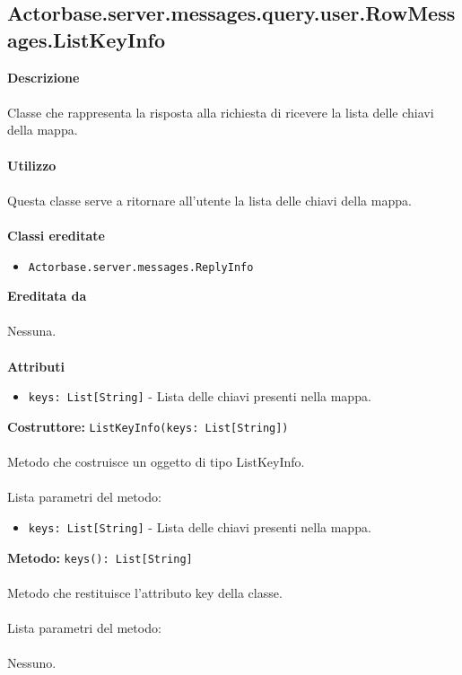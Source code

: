 \documentclass[a4paper]{article}
\begin{document}
	\subsection{Actorbase.server.messages.query.user.RowMessages.ListKeyInfo}
		\textbf{Descrizione}
			\\ \\
		Classe che rappresenta la risposta alla richiesta di ricevere la lista delle chiavi della mappa.
			\\ \\
		\textbf{Utilizzo}
			\\ \\
		Questa classe serve a ritornare all'utente la lista delle chiavi della mappa.
			\\ \\
		\textbf{Classi ereditate}
			\begin{itemize}
				\item \texttt{Actorbase.server.messages.ReplyInfo }
			\end{itemize}
		\textbf{Ereditata da}
			\\ \\
			Nessuna.
			\\ \\
		\textbf{Attributi}
			\begin{itemize}
				\item \texttt{keys: List[String]} - Lista delle chiavi presenti nella mappa.
			\end{itemize}
		\textbf{Costruttore: }\texttt{ListKeyInfo(keys: List[String])}
			\\ \\
		Metodo che costruisce un oggetto di tipo ListKeyInfo.
			\\ \\
		Lista parametri del metodo:
			\begin{itemize}
				\item \texttt{keys: List[String]} - Lista delle chiavi presenti nella mappa.
			\end{itemize}
		\textbf{Metodo: }\texttt{keys(): List[String]}
			\\ \\
		Metodo che restituisce l'attributo key della classe.
			\\ \\
		Lista parametri del metodo:
			\\ \\
			Nessuno.
			
\end{document}
